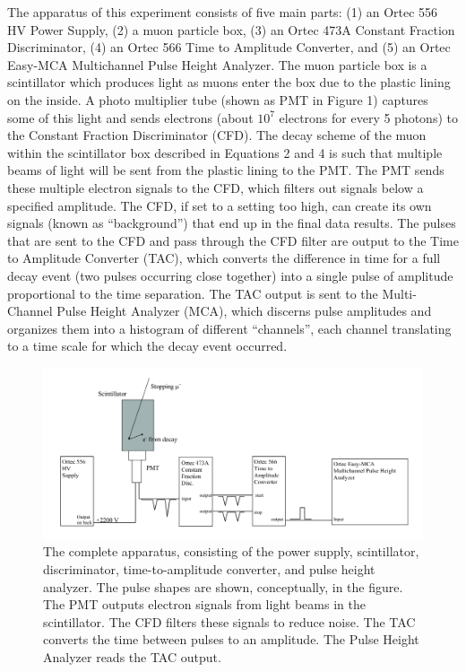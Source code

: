\documentclass[%
 aip,
 amsmath,amssymb,
 reprint,%
floatfix,
]{revtex4-1}
\begin{document}
The apparatus of this experiment consists of five main parts: (1) an Ortec 556 HV Power Supply, (2) a muon particle box, (3) an Ortec 473A Constant Fraction Discriminator, (4) an Ortec 566 Time to Amplitude Converter, and (5) an Ortec Easy-MCA Multichannel Pulse Height Analyzer. The muon particle box is a scintillator which produces light as muons enter the box due to the plastic lining on the inside. A photo multiplier tube (shown as PMT in Figure 1) captures some of this light and sends electrons (about $10^7$ electrons for every 5 photons) to the Constant Fraction Discriminator (CFD). The decay scheme of the muon within the scintillator box described in Equations 2 and 4 is such that multiple beams of light will be sent from the plastic lining to the PMT. The PMT sends these multiple electron signals to the CFD, which filters out signals below a specified amplitude. The CFD, if set to a setting too high, can create its own signals (known as “background”) that end up in the final data results. The pulses that are sent to the CFD and pass through the CFD filter are output to the Time to Amplitude Converter (TAC), which converts the difference in time for a full decay event (two pulses occurring close together) into a single pulse of amplitude proportional to the time separation. The TAC output is sent to the Multi-Channel Pulse Height Analyzer (MCA), which discerns pulse amplitudes and organizes them into a histogram of different “channels”, each channel translating to a time scale for which the decay event occurred.

\begin{figure}[H]
	\centering
	\includegraphics[scale=0.25]{schematic.png}
	\caption{The complete apparatus, consisting of the power supply, scintillator, discriminator, time-to-amplitude converter, and pulse height analyzer. The pulse shapes are shown, conceptually, in the figure. The PMT outputs electron signals from light beams in the scintillator. The CFD filters these signals to reduce noise. The TAC converts the time between pulses to an amplitude. The Pulse Height Analyzer reads the TAC output.\cite{oxymanual}}
\end{figure}
\end{document}
